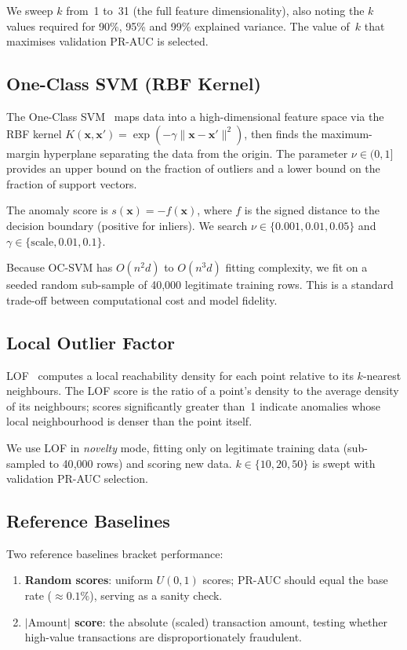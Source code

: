 We sweep $k$ from~1 to~31 (the full feature dimensionality), also noting
the $k$ values required for 90\%, 95\% and 99\% explained variance.  The
value of~$k$ that maximises validation PR-AUC is selected.

\subsection{One-Class SVM (RBF Kernel)}
\label{sec:ocsvm}

The One-Class SVM~\cite{scholkopf2001estimating} maps data into a
high-dimensional feature space via the RBF kernel
$K(\mathbf{x},\mathbf{x}') = \exp(-\gamma\|\mathbf{x}-\mathbf{x}'\|^2)$,
then finds the maximum-margin hyperplane separating the data from the origin.
The parameter $\nu \in (0,1]$ provides an upper bound on the fraction of
outliers and a lower bound on the fraction of support vectors.

The anomaly score is $s(\mathbf{x}) = -f(\mathbf{x})$, where $f$ is the
signed distance to the decision boundary (positive for inliers).  We search
$\nu \in \{0.001, 0.01, 0.05\}$ and $\gamma \in \{\text{scale}, 0.01, 0.1\}$.

Because OC-SVM has $O(n^2 d)$ to $O(n^3 d)$ fitting complexity, we fit on a
seeded random sub-sample of 40{,}000 legitimate training rows.  This is a
standard trade-off between computational cost and model fidelity.

\subsection{Local Outlier Factor}
\label{sec:lof}

LOF~\cite{breunig2000lof} computes a local reachability density for each point
relative to its $k$-nearest neighbours.  The LOF score is the ratio of a
point's density to the average density of its neighbours; scores
significantly greater than~1 indicate anomalies whose local neighbourhood
is denser than the point itself.

We use LOF in \emph{novelty} mode, fitting only on legitimate training data
(sub-sampled to 40{,}000 rows) and scoring new data.
$k \in \{10, 20, 50\}$ is swept with validation PR-AUC selection.

\subsection{Reference Baselines}
\label{sec:ref_baselines}

Two reference baselines bracket performance:
\begin{enumerate}
    \item \textbf{Random scores}: uniform $U(0,1)$ scores; PR-AUC should
          equal the base rate ($\approx 0.1\%$), serving as a sanity check.
    \item \textbf{$|\text{Amount}|$ score}: the absolute (scaled) transaction
          amount, testing whether high-value transactions are disproportionately
          fraudulent.
\end{enumerate}
